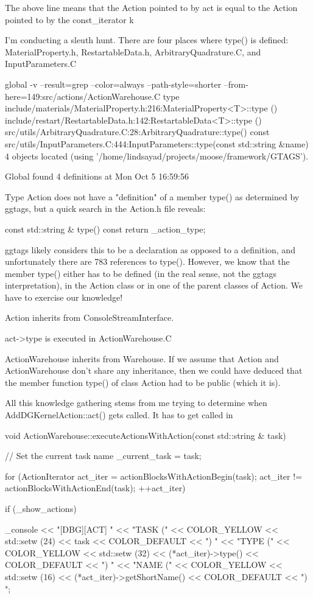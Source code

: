 {The above line means that the Action pointed to by act is equal to the Action pointed to by the const_iterator k

I'm conducting a sleuth hunt. There are four places where type() is defined: MaterialProperty.h, RestartableData.h, ArbitraryQuadrature.C, and InputParameters.C

global -v --result=grep --color=always --path-style=shorter --from-here=149:src/actions/ActionWarehouse.C type
include/materials/MaterialProperty.h:216:MaterialProperty<T>::type ()
include/restart/RestartableData.h:142:RestartableData<T>::type ()
src/utils/ArbitraryQuadrature.C:28:ArbitraryQuadrature::type() const
src/utils/InputParameters.C:444:InputParameters::type(const std::string &name)
4 objects located (using '/home/lindsayad/projects/moose/framework/GTAGS').

Global found 4 definitions at Mon Oct  5 16:59:56

Type Action does not have a "definition" of a member type() as determined by ggtags, but a quick search in the Action.h file reveals:

  const std::string & type() const { return _action_type; }

ggtags likely considers this to be a declaration as opposed to a definition, and unfortunately there are 783 references to type(). However, we know that the member type() either has to be defined (in the real sense, not the ggtags interpretation), in the Action class or in one of the parent classes of Action. We have to exercise our knowledge!

Action inherits from ConsoleStreamInterface.

act->type is executed in ActionWarehouse.C

ActionWarehouse inherits from Warehouse. If we assume that Action and ActionWarehouse don't share any inheritance, then we could have deduced that the member function type() of class Action had to be public (which it is).

All this knowledge gathering stems from me trying to determine when AddDGKernelAction::act() gets called. It has to get called in

void
ActionWarehouse::executeActionsWithAction(const std::string & task)
{
  // Set the current task name
  _current_task = task;

  for (ActionIterator act_iter = actionBlocksWithActionBegin(task);
       act_iter != actionBlocksWithActionEnd(task);
       ++act_iter)
  {
    if (_show_actions)
    {
      _console << "[DBG][ACT] "
               << "TASK (" << COLOR_YELLOW << std::setw (24) << task << COLOR_DEFAULT << ") "
               << "TYPE (" << COLOR_YELLOW << std::setw (32) << (*act_iter)->type() << COLOR_DEFAULT << ") "
               << "NAME (" << COLOR_YELLOW << std::setw (16) << (*act_iter)->getShortName() << COLOR_DEFAULT << ") ";

}}}}
